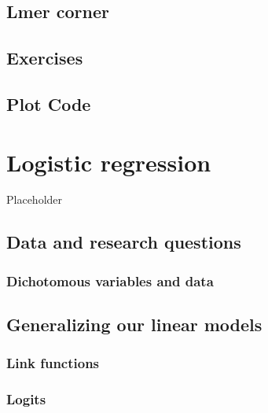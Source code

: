 \documentclass[
]{book}
\begin{document}
\hypertarget{lmer-corner-2}{%
\section{Lmer corner}\label{lmer-corner-2}}

\hypertarget{exercises-5}{%
\section{Exercises}\label{exercises-5}}

\hypertarget{plot-code-5}{%
\section{Plot Code}\label{plot-code-5}}

\hypertarget{logistic-regression}{%
\chapter{Logistic regression}\label{logistic-regression}}

Placeholder

\hypertarget{data-and-research-questions-6}{%
\section{Data and research questions}\label{data-and-research-questions-6}}

\hypertarget{dichotomous-variables-and-data}{%
\subsection{Dichotomous variables and data}\label{dichotomous-variables-and-data}}

\hypertarget{generalizing-our-linear-models}{%
\section{Generalizing our linear models}\label{generalizing-our-linear-models}}

\hypertarget{link-functions}{%
\subsection{Link functions}\label{link-functions}}

\hypertarget{logits}{%
\subsection{Logits}\label{logits}}
\end{document}
